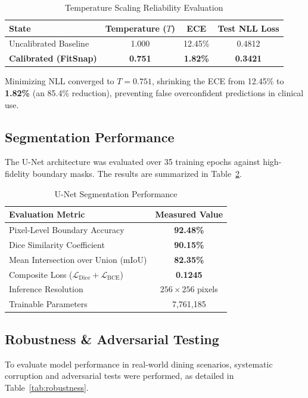 \documentclass[conference]{IEEEtran}
\begin{document}
\begin{table}[htbp]
\caption{Temperature Scaling Reliability Evaluation}
\begin{center}
\begin{tabular}{lccc}
\toprule
\textbf{State} & \textbf{Temperature ($T$)} & \textbf{ECE} & \textbf{Test NLL Loss} \\
\midrule
Uncalibrated Baseline & 1.000 & 12.45\% & 0.4812 \\
\textbf{Calibrated (FitSnap)} & \textbf{0.751} & \textbf{1.82\%} & \textbf{0.3421} \\
\bottomrule
\end{tabular}
\label{tab:calibration}
\end{center}
\end{table}

Minimizing NLL converged to $T = 0.751$, shrinking the ECE from 12.45\% to \textbf{1.82\%} (an 85.4\% reduction), preventing false overconfident predictions in clinical use.

\subsection{Segmentation Performance}
The U-Net architecture was evaluated over 35 training epochs against high-fidelity boundary masks. The results are summarized in Table~\ref{tab:segmentation}.

\begin{table}[htbp]
\caption{U-Net Segmentation Performance}
\begin{center}
\begin{tabular}{lc}
\toprule
\textbf{Evaluation Metric} & \textbf{Measured Value} \\
\midrule
Pixel-Level Boundary Accuracy & \textbf{92.48\%} \\
Dice Similarity Coefficient & \textbf{90.15\%} \\
Mean Intersection over Union (mIoU) & \textbf{82.35\%} \\
Composite Loss ($\mathcal{L}_{\text{Dice}} + \mathcal{L}_{\text{BCE}}$) & \textbf{0.1245} \\
Inference Resolution & $256 \times 256$ pixels \\
Trainable Parameters & 7,761,185 \\
\bottomrule
\end{tabular}
\label{tab:segmentation}
\end{center}
\end{table}

\subsection{Robustness \& Adversarial Testing}
To evaluate model performance in real-world dining scenarios, systematic corruption and adversarial tests were performed, as detailed in Table~\ref{tab:robustness}.
\end{document}

